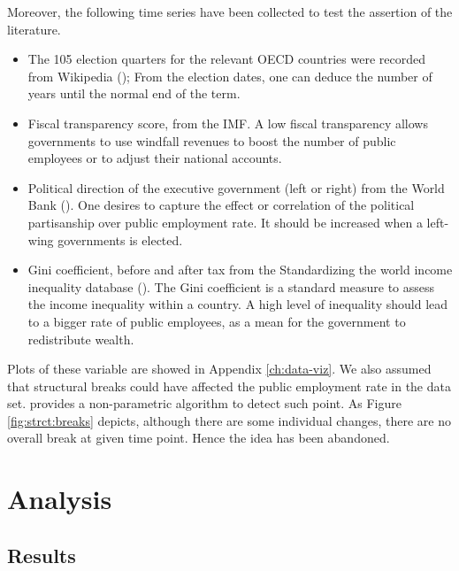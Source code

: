 Moreover, the following time series have been collected to test the assertion
of the literature.
\begin{itemize}
\item The 105 election quarters for the relevant OECD countries were recorded
  from Wikipedia (\cite{wiki2015election}); From the election dates, one can
  deduce the number of years until the normal end of the term.
\item Fiscal transparency score, \cite{wang2015trends} from the IMF. A low
  fiscal transparency allows governments to use windfall revenues to boost the
  number of public employees or to adjust their national accounts.
\item Political direction of the executive government (left or right) from the
  World Bank (\cite{beck2001new}). One desires to capture the effect or
  correlation of the political partisanship over public employment rate. It
  should be increased when a left-wing governments is elected.
\item Gini coefficient, before and after tax from the Standardizing the world
  income inequality database (\cite{solt2009standardizing}). The Gini
  coefficient is a standard measure to assess the income inequality within a
  country. A high level of inequality should lead to a bigger rate of public
  employees, as a mean for the government to redistribute wealth.
\end{itemize}

Plots of these variable are showed in Appendix \ref{ch:data-viz}. We also
assumed that structural breaks could have affected the public employment rate
in the data set. \cite{james2014ecp} provides a non-parametric algorithm to
detect such point. As Figure \ref{fig:strct:breaks} depicts, although there are
some individual changes, there are no overall break at given time point. Hence
the idea has been abandoned.

\section{Analysis}

\subsection{Results}

